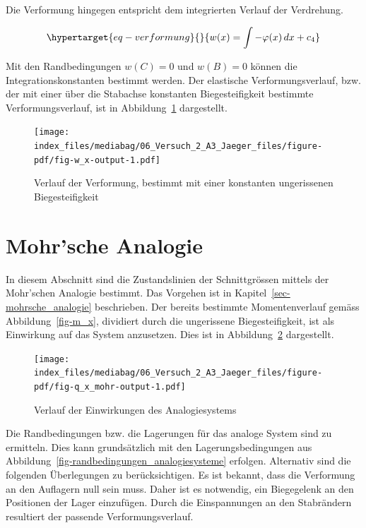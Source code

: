 \documentclass[
  12pt,
  letterpaper,
  egregdoesnotlikesansseriftitles]{scrreprt}
\begin{document}
Die Verformung hingegen entspricht dem integrierten Verlauf der
Verdrehung.

\begin{equation}\protect\hypertarget{eq-verformung}{}{
w(x) = \int -\varphi(x) \, dx + c_4
}\label{eq-verformung}\end{equation}

Mit den Randbedingungen \(w(C) = 0\) und \(w(B) = 0\) können die
Integrationskonstanten bestimmt werden. Der elastische
Verformungsverlauf, bzw. der mit einer über die Stabachse konstanten
Biegesteifigkeit bestimmte Verformungsverlauf, ist in
Abbildung~\ref{fig-w_x} dargestellt.

\begin{figure}[H]

{\centering \texttt{[image: index\_files/mediabag/06\_Versuch\_2\_A3\_Jaeger\_files/figure-pdf/fig-w\_x-output-1.pdf]}

}

\caption{\label{fig-w_x}Verlauf der Verformung, bestimmt mit einer
konstanten ungerissenen Biegesteifigkeit}

\end{figure}

\hypertarget{mohrsche-analogie}{%
\section{Mohr'sche Analogie}\label{mohrsche-analogie}}

In diesem Abschnitt sind die Zustandslinien der Schnittgrössen mittels
der Mohr'schen Analogie bestimmt. Das Vorgehen ist in
Kapitel~\ref{sec-mohrsche_analogie} beschrieben. Der bereits bestimmte
Momentenverlauf gemäss Abbildung~\ref{fig-m_x}, dividiert durch die
ungerissene Biegesteifigkeit, ist als Einwirkung auf das System
anzusetzen. Dies ist in Abbildung~\ref{fig-q_x_mohr} dargestellt.

\begin{figure}[H]

{\centering \texttt{[image: index\_files/mediabag/06\_Versuch\_2\_A3\_Jaeger\_files/figure-pdf/fig-q\_x\_mohr-output-1.pdf]}

}

\caption{\label{fig-q_x_mohr}Verlauf der Einwirkungen des
Analogiesystems}

\end{figure}

Die Randbedingungen bzw. die Lagerungen für das analoge System sind zu
ermitteln. Dies kann grundsätzlich mit den Lagerungsbedingungen aus
Abbildung~\ref{fig-randbedingungen_analogiesysteme} erfolgen. Alternativ
sind die folgenden Überlegungen zu berücksichtigen. Es ist bekannt, dass
die Verformung an den Auflagern null sein muss. Daher ist es notwendig,
ein Biegegelenk an den Positionen der Lager einzufügen. Durch die
Einspannungen an den Stabrändern resultiert der passende
Verformungsverlauf.
\end{document}
